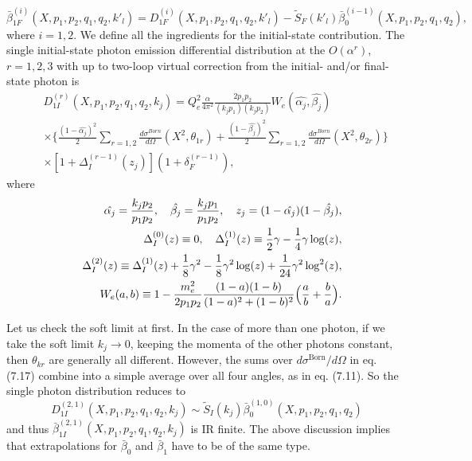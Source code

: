 \begin{equation}
\bar{\beta}_{1F}^{(i)}(X,p_1,p_2,q_1,q_2,k'_l)=D_{1F}^{(i)}(X,p_1,p_2,q_1,q_2,k'_l)-\tilde{S}_F(k'_l)\bar{\beta}_0^{(i-1)}(X,p_1,p_2,q_1,q_2),
\end{equation}
where $i = 1,2$. We define all the ingredients for the initial-state contribution. The single initial-state photon emission differential distribution at the $O(\alpha^r)$,$r=1,2,3$ with up to two-loop virtual correction from the initial- and/or final-state photon is 
\begin{eqnarray}
&&D_{1I}^{(r)}(X,p_1,p_2,q_1,q_2,k_j)=Q_e^2\frac{\alpha}{4\pi^2}\frac{2p_1 p_2}{(k_j p_1)(k_j p_2)} W_e(\hat{\alpha_j},\hat{\beta_j})\nonumber\\
&&\times \Biggl\{ \frac{(1-\hat{\alpha_j})^2}{2} \sum_{r=1,2} \frac{d\sigma^{Born}}{d\Omega}(X^2, \theta_{1r}) + \frac{(1-\hat{\beta_j})^2}{2} \sum_{r=1,2} \frac{d\sigma^{Born}}{d\Omega}(X^2, \theta_{2r}) \Biggr\}\nonumber\\
&&\times \left[1+\Delta_I^{(r-1)}(z_j)\right](1+\delta_F^{(r-1)}),
\end{eqnarray} 
where
\begin{eqnarray}
&&\hat{\alpha_j}=\frac{k_j p_2}{p_1 p_2},  \quad \hat{\beta_j}=\frac{k_j p_1}{p_1 p_2},\quad z_j=(1-\hat{\alpha_j})(1-\hat{\beta_j}),\nonumber\\
&&\Delta_I^{(0)}(z)\equiv 0, \quad \Delta_I^{(1)}(z)\equiv \frac{1}{2}\gamma-\frac{1}{4}\gamma\log(z),\nonumber\\
&&\Delta_I^{(2)}(z)\equiv \Delta_I^{(1)}(z)+\frac{1}{8}\gamma^2-\frac{1}{8}\gamma^2\log(z)+\frac{1}{24}\gamma^2\log^2(z),\nonumber\\
&&W_e(a,b)\equiv 1-\frac{m_e^2}{2p_1 p_2}\frac{(1-a)(1-b)}{(1-a)^2+(1-b)^2}\Bigl(\frac{a}{b}+\frac{b}{a}\Bigr).
\end{eqnarray}

Let us check the soft limit at first. In the case of more than one photon, if we take the soft limit $k_j\to 0$, keeping the momenta of the other photons constant, then $\theta_{kr}$ are generally all different. However, the sums over $d\sigma^\text{Born}/d\Omega$ in eq. (7.17) combine into a simple average over all four angles, as in eq. (7.11). So the single photon distribution reduces to 
\begin{equation}
D_{1I}^{(2,1)}(X,p_1,p_2,q_1,q_2,k_j)\sim\tilde{S}_I(k_j)\bar{\beta}_0^{(1,0)}(X,p_1,p_2,q_1,q_2)
\end{equation}
and thus $\bar{\beta}_{1I}^{(2,1)}(X,p_1,p_2,q_1,q_2,k_j)$ is IR finite. The above discussion implies that extrapolations for $\bar{\beta}_0$ and $\bar{\beta}_1$ have to be of the same type. 


